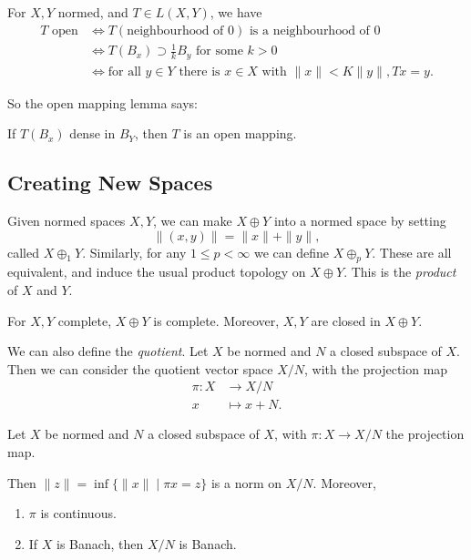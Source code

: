 \documentclass[12pt]{article}
\begin{document}
For $X, Y$ normed, and $T \in L(X, Y)$, we have
\begin{align*}
	T \text{ open} &\iff T(\text{neighbourhood of } 0) \text{ is a neighbourhood of } 0 \\
		       &\iff T(B_x) \supset \frac{1}{k} B_y \text{ for some } k > 0 \\
		       &\iff \text{for all } y \in Y \text{ there is } x \in X \text{ with } \|x\| < K \|y\|, Tx = y.
\end{align*}

So the open mapping lemma says:
\begin{center}
	If $T(B_x)$ dense in $B_Y$, then $T$ is an open mapping.
\end{center}

\subsection{Creating New Spaces}
\label{sub:new_spac}

Given normed spaces $X, Y$, we can make $X \oplus Y$ into a normed space by setting
\[
\|(x,y)\| = \|x\| + \|y\|,
\]
called $X\oplus_1 Y$. Similarly, for any $1 \leq p < \infty$ we can define $X \oplus_p Y$. These are all equivalent, and induce the usual product topology on $X\oplus Y$. This is the \emph{product} of $X$ and $Y$.

For $X, Y$ complete, $X \oplus Y$ is complete. Moreover, $X, Y$ are closed in $X \oplus Y$.

We can also define the \emph{quotient}. Let $X$ be normed and $N$ a closed subspace of $X$. Then we can consider the quotient vector space $X/N$, with the projection map
\begin{align*}
	\pi : X &\to X/N \\
	x &\mapsto x+N.
\end{align*}

\begin{proposition}
	Let $X$ be normed and $N$ a closed subspace of $X$, with $\pi : X \to X/N$ the projection map.

	Then $\|z\| = \inf\{\|x\| \mid \pi x = z\}$ is a norm on $X/N$. Moreover,
	\begin{enumerate}[\normalfont(i)]
		\item $\pi$ is continuous.
		\item If $X$ is Banach, then $X/N$ is Banach.
	\end{enumerate}
\end{proposition}
\end{document}
